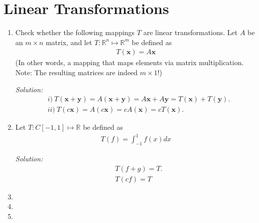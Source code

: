 \documentclass[a4paper,10pt]{report}
\newcommand{\vb}[1]{\mathbf{#1}}		%
\begin{document}
\chapter{Linear Transformations}
\begin{enumerate}
  \item %
    Check whether the following mappings $T$ are linear transformations.
    Let $A$ be an $m\times n$ matrix, and let $T: \mathbb{R}^n\mapsto\mathbb{R}^m$ be defined as
    \begin{align*}
      T(\vb{x}) = A\vb{x}
    \end{align*}
    (In other words, a mapping that maps elements via matrix multiplication. Note: The resulting matrices are indeed $m\times 1$!)

    \textit{Solution: }
    \begin{align*}
      &i) ~ T(\vb{x}+\vb{y}) = A(\vb{x}+\vb{y}) = A\vb{x} + A\vb{y} = T(\vb{x}) + T(\vb{y}). \\
      &ii)~ T(c\vb{x}) = A(c\vb{x}) = cA(\vb{x}) = cT(\vb{x}).
    \end{align*}

  \item %
    Let $T:C[-1,1]\mapsto\mathbb{R}$ be defined as
    \begin{align*}
      T(f) = \int_{-1}^{1}f(x)dx
    \end{align*}

    \textit{Solution: }
    \begin{align*}
      &T(f+g) = T. \\
      &T(cf) = T
    \end{align*}


  \item %
  \item %
  \item %
\end{enumerate}
\end{document}
